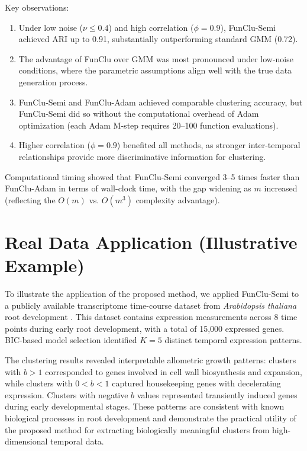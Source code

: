 \documentclass[12pt,a4paper]{article}
\begin{document}
Key observations:
\begin{enumerate}[leftmargin=*]
    \item Under low noise ($\nu \leq 0.4$) and high correlation ($\phi = 0.9$), FunClu-Semi achieved ARI up to 0.91, substantially outperforming standard GMM (0.72).
    \item The advantage of FunClu over GMM was most pronounced under low-noise conditions, where the parametric assumptions align well with the true data generation process.
    \item FunClu-Semi and FunClu-Adam achieved comparable clustering accuracy, but FunClu-Semi did so without the computational overhead of Adam optimization (each Adam M-step requires 20--100 function evaluations).
    \item Higher correlation ($\phi = 0.9$) benefited all methods, as stronger inter-temporal relationships provide more discriminative information for clustering.
\end{enumerate}

Computational timing showed that FunClu-Semi converged 3--5 times faster than FunClu-Adam in terms of wall-clock time, with the gap widening as $m$ increased (reflecting the $O(m)$ vs. $O(m^3)$ complexity advantage).

\section{Real Data Application (Illustrative Example)}

To illustrate the application of the proposed method, we applied FunClu-Semi to a publicly available transcriptome time-course dataset from \textit{Arabidopsis thaliana} root development \cite{li2010functional}. This dataset contains expression measurements across 8 time points during early root development, with a total of 15,000 expressed genes. BIC-based model selection identified $K=5$ distinct temporal expression patterns.

The clustering results revealed interpretable allometric growth patterns: clusters with $b > 1$ corresponded to genes involved in cell wall biosynthesis and expansion, while clusters with $0 < b < 1$ captured housekeeping genes with decelerating expression. Clusters with negative $b$ values represented transiently induced genes during early developmental stages. These patterns are consistent with known biological processes in root development and demonstrate the practical utility of the proposed method for extracting biologically meaningful clusters from high-dimensional temporal data.
\end{document}

